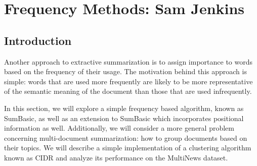 \documentclass[../writeup.tex]{subfiles}
\begin{document}
\chapter{Frequency Methods: Sam Jenkins}\label{chapter:sam}


\section{Introduction}\label{sam:sec:intro}
Another approach to extractive summarization is to assign importance to words based on the frequency of their usage.
The motivation behind this approach is simple: words that are used more frequently are likely to be more representative of the semantic meaning of the document than those that are used infrequently.

In this section, we will explore a simple frequency based algorithm, known as SumBasic, as well as an extension to SumBasic which incorporates positional information as well.
Additionally, we will consider a more general problem concerning multi-document summarization: how to group documents based on their topics.
We will describe a simple implementation of a clustering algorithm known as CIDR and analyze its performance on the MultiNews dataset.
\end{document}
